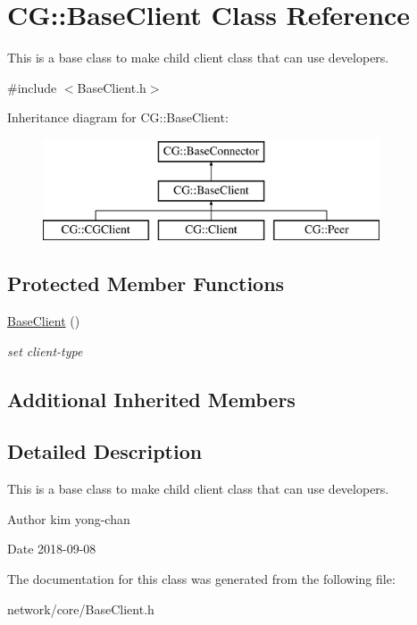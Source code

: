 \hypertarget{class_c_g_1_1_base_client}{}\section{CG\+:\+:Base\+Client Class Reference}
\label{class_c_g_1_1_base_client}


This is a base class to make child client class that can use developers.  




{\ttfamily \#include $<$Base\+Client.\+h$>$}

Inheritance diagram for CG\+:\+:Base\+Client\+:\begin{figure}[H]
\begin{center}
\leavevmode
\includegraphics[height=3.000000cm]{class_c_g_1_1_base_client}
\end{center}
\end{figure}
\subsection*{Protected Member Functions}
\begin{DoxyCompactItemize}
\item 
\mbox{\label{class_c_g_1_1_base_client_ade64ddce7c3af76c9a4be5fa685bca4d}} 
\mbox{\hyperlink{class_c_g_1_1_base_client_ade64ddce7c3af76c9a4be5fa685bca4d}{Base\+Client}} ()
\begin{DoxyCompactList}\small\item\em set client-\/type \end{DoxyCompactList}\end{DoxyCompactItemize}
\subsection*{Additional Inherited Members}


\subsection{Detailed Description}
This is a base class to make child client class that can use developers. 

\begin{DoxyAuthor}{Author}
kim yong-\/chan 
\end{DoxyAuthor}
\begin{DoxyDate}{Date}
2018-\/09-\/08 
\end{DoxyDate}


The documentation for this class was generated from the following file\+:\begin{DoxyCompactItemize}
\item 
network/core/Base\+Client.\+h\end{DoxyCompactItemize}
